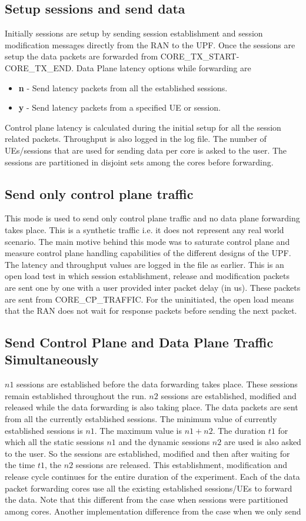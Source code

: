 \documentclass{article}
\begin{document}
\subsection{Setup sessions and send data}
Initially sessions are setup by sending session establishment and session modification messages directly from the RAN to the UPF.
Once the sessions are setup the data packets are forwarded from CORE\_TX\_START- CORE\_TX\_END. Data Plane latency options while
forwarding are
\begin{itemize}
    \item\textbf{n} - Send latency packets from all the established sessions.
    \item\textbf{y} - Send latency packets from a specified UE or session.
\end{itemize}
Control plane latency is calculated during the initial setup for all the session related packets. Throughput is also logged in the log file.
The number of UEs/sessions that are used for sending data per core is asked to the user. The sessions are partitioned in disjoint sets among the cores before forwarding.

\subsection{Send only control plane traffic}
This mode is used to send only control plane traffic and no data plane forwarding takes place.
This is a synthetic traffic i.e. it does not represent any real world scenario. The main motive behind this mode was to saturate control plane and measure control plane handling capabilities of the different designs of the UPF. The latency and throughput values are logged in the file as earlier.
This is an open load test in which session establishment, release and modification packets are sent one by one with a user provided inter packet delay (in us). These packets are sent from CORE\_CP\_TRAFFIC. For the uninitiated, the open load means that the RAN does not wait for response packets before sending the next packet.
\subsection{Send Control Plane and Data Plane Traffic Simultaneously}
$n1$ sessions are established before the data forwarding takes place. These sessions remain established throughout the run.
$n2$ sessions are established, modified and released while the data forwarding is also taking place. The data packets are sent from all the currently established sessions. The minimum value of currently established sessions is $n1$. The maximum value is $n1+n2$.
The duration $t1$ for which all the static sessions $n1$ and the dynamic sessions $n2$ are used is also asked to the user. So the sessions are established, modified and then after waiting for the time $t1$, the $n2$ sessions are released. This establishment, modification and release cycle continues for the entire duration of the experiment.
Each of the data packet forwarding cores use all the existing established sessions/UEs to forward the data. Note that this different from the case when sessions were partitioned among cores.
Another implementation difference from the case when we only send
\end{document}
